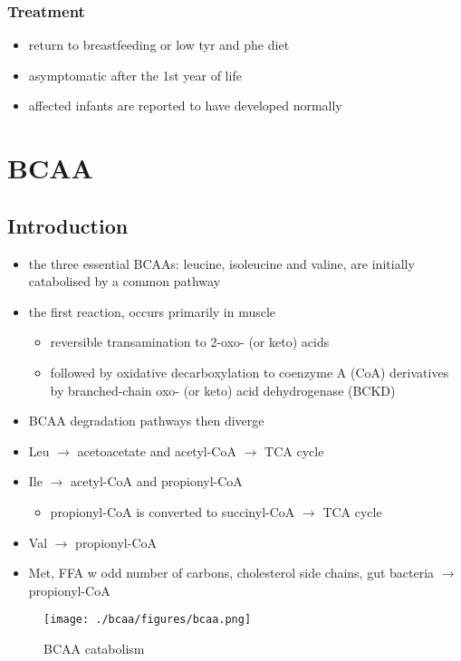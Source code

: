\documentclass{scrartcl}
\begin{document}
\subsubsection{Treatment}
\label{sec:orgf14ae01}
\begin{itemize}
\item return to breastfeeding or low tyr and phe diet
\item asymptomatic after the 1st year of life
\item affected infants are reported to have developed normally
\end{itemize}

\section{BCAA}
\label{sec:orga474d82}
\subsection{Introduction}
\label{sec:org20d04fb}
\begin{itemize}
\item the three essential BCAAs: leucine, isoleucine and valine, are
initially catabolised by a common pathway
\item the first reaction, occurs primarily in muscle
\begin{itemize}
\item reversible transamination to 2-oxo- (or keto) acids
\item followed by oxidative decarboxylation to coenzyme A (CoA)
derivatives by branched-chain oxo- (or keto) acid dehydrogenase
(BCKD)
\end{itemize}
\item BCAA degradation pathways then diverge
\item Leu \(\to\) acetoacetate and acetyl-CoA \(\to\) TCA cycle
\item Ile \(\to\) acetyl-CoA and propionyl-CoA
\begin{itemize}
\item propionyl-CoA is converted to succinyl-CoA \(\to\) TCA cycle
\end{itemize}
\item Val \(\to\) propionyl-CoA
\item Met, FFA w odd number of carbons, cholesterol side chains, gut
bacteria \(\to\) propionyl-CoA
\end{itemize}

\begin{figure}[htbp]
\centering
\texttt{[image: ./bcaa/figures/bcaa.png]}
\caption{\label{fig:org8633fa4}
BCAA catabolism}
\end{figure}
\end{document}
